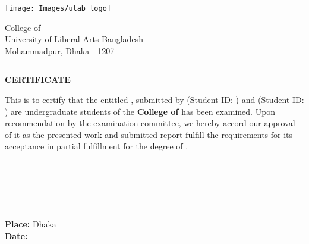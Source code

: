 \thispagestyle{plain}
\noindent
\begin{minipage}{0.37\textwidth}
\texttt{[image: Images/ulab\_logo]}
\end{minipage}
\begin{minipage}{0.63\textwidth}

 College of \College  \\
 University of Liberal Arts Bangladesh \\
 Mohammadpur, Dhaka - 1207
\end{minipage}

\vspace{0.5\baselineskip}
\hrule
\vspace{2\baselineskip}

\begin{center}
{\Large {\bf \uppercase{Certificate}}}
\end{center}

\vspace{\baselineskip}

\noindent This is to certify that the \MakeTextLowercase{\RoportType} entitled {\bf \ReportTitle}, submitted by {\bf \firstAuthor} (Student ID: {\firstAuthorID}) and {\bf \secondAuthor} (Student ID: {\secondAuthorID}) are undergraduate students of the {\bf College of \College } has been examined. Upon recommendation by the examination committee, we hereby accord our approval of it as the presented work and submitted report fulfill the requirements for its acceptance in partial fulfillment for the degree of \emph{\Degree}. 

\vspace{3\baselineskip}
\begin{flushright}
\begin{minipage}[c]{0.63\textwidth}
\centering
\hrule 
\vspace{0.5\baselineskip}
{\bf \Supervisor \\ \SupervisorPosition} \par
{}
\end{minipage}
\end{flushright}
\vspace{2\baselineskip}
\begin{flushright}
\begin{minipage}[c]{0.63\textwidth}
\centering
\hrule 
\vspace{0.5\baselineskip}
{\bf \HodName\\ \HodPosition} \par
{}
\end{minipage}
\end{flushright}
\vspace{\baselineskip}

\noindent
{\bf Place:} Dhaka \\
{\bf Date:} \reportSubmissionDate